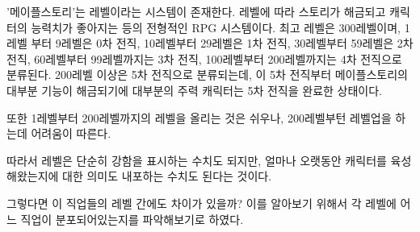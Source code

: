 \documentclass[
]{article}
\begin{document}
'메이플스토리'는 레벨이라는 시스템이 존재한다. 레벨에 따라 스토리가
해금되고 캐릭터의 능력치가 좋아지는 등의 전형적인 RPG 시스템이다. 최고
레벨은 300레벨이며, 1레벨 부터 9레벨은 0차 전직, 10레벨부터 29레벨은 1차
전직, 30레벨부터 59레벨은 2차 전직, 60레벨부터 99레벨까지는 3차 전직,
100레벨부터 200레벨까지는 4차 전직으로 분류된다. 200레벨 이상은 5차
전직으로 분류되는데, 이 5차 전직부터 메이플스토리의 대부분 기능이
해금되기에 대부분의 주력 캐릭터는 5차 전직을 완료한 상태이다.

또한 1레벨부터 200레벨까지의 레벨을 올리는 것은 쉬우나, 200레벨부턴
레벨업을 하는데 어려움이 따른다.

따라서 레벨은 단순히 강함을 표시하는 수치도 되지만, 얼마나 오랫동안
캐릭터를 육성해왔는지에 대한 의미도 내포하는 수치도 된다는 것이다.

그렇다면 이 직업들의 레벨 간에도 차이가 있을까? 이를 알아보기 위해서 각
레벨에 어느 직업이 분포되어있는지를 파악해보기로 하였다.
\end{document}
